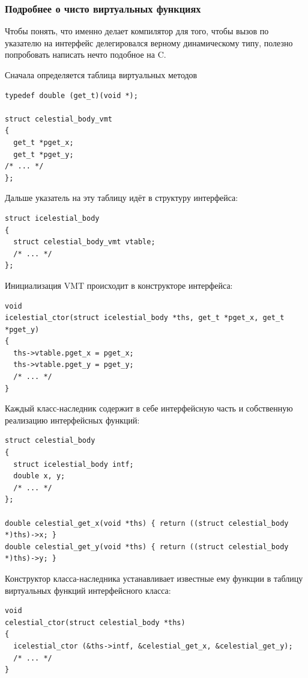 \documentclass[a4paper,12pt,oneside]{article}
\begin{document}
\subsubsection{Подробнее о чисто виртуальных функциях}\label{VirtualUnderHood}

Чтобы понять, что именно делает компилятор для того, чтобы вызов по указателю на интерфейс делегировался верному динамическому типу, полезно попробовать написать нечто подобное на C.

Сначала определяется таблица виртуальных методов

\begin{lstlisting}
typedef double (get_t)(void *);

struct celestial_body_vmt
{
  get_t *pget_x;
  get_t *pget_y;
/* ... */
};
\end{lstlisting}

Дальше указатель на эту таблицу идёт в структуру интерфейса:

\begin{lstlisting}
struct icelestial_body
{
  struct celestial_body_vmt vtable;
  /* ... */
};
\end{lstlisting}

Инициализация VMT происходит в конструкторе интерфейса:

\begin{lstlisting}
void
icelestial_ctor(struct icelestial_body *ths, get_t *pget_x, get_t *pget_y)
{
  ths->vtable.pget_x = pget_x;
  ths->vtable.pget_y = pget_y;
  /* ... */
}
\end{lstlisting}

Каждый класс-наследник содержит в себе интерфейсную часть и собственную реализацию интерфейсных функций:

\begin{lstlisting}
struct celestial_body
{
  struct icelestial_body intf;
  double x, y;
  /* ... */
};

double celestial_get_x(void *ths) { return ((struct celestial_body *)ths)->x; }
double celestial_get_y(void *ths) { return ((struct celestial_body *)ths)->y; }
\end{lstlisting}

Конструктор класса-наследника устанавливает известные ему функции в таблицу виртуальных функций интерфейсного класса:

\begin{lstlisting}
void 
celestial_ctor(struct celestial_body *ths)
{
  icelestial_ctor (&ths->intf, &celestial_get_x, &celestial_get_y);
  /* ... */  
}
\end{lstlisting}
\end{document}
